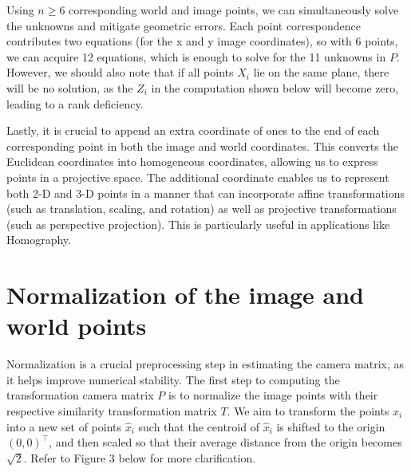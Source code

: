 \documentclass[12pt]{article}
\begin{document}
Using \( n \geq 6 \) corresponding world and image points, we can simultaneously solve the unknowns and mitigate geometric errors. Each point correspondence contributes two equations (for the x and y image coordinates), so with 6 points, we can acquire 12 equations, which is enough to solve for the 11 unknowns in \( P \). However, we should also note that if all points \( X_i \) lie on the same plane, there will be no solution, as the \( Z_i \) in the computation shown below will become zero, leading to a rank deficiency.

Lastly, it is crucial to append an extra coordinate of ones to the end of each corresponding point in both the image and world coordinates. This converts the Euclidean coordinates into homogeneous coordinates, allowing us to express points in a projective space. The additional coordinate enables us to represent both 2-D and 3-D points in a manner that can incorporate affine transformations (such as translation, scaling, and rotation) as well as projective transformations (such as perspective projection). This is particularly useful in applications like Homography.

\section{Normalization of the image and world points}
Normalization is a crucial preprocessing step in estimating the camera matrix, as it helps improve numerical stability. The first step to computing the transformation camera matrix \( P \) is to normalize the image points with their respective similarity transformation matrix \( T\). We aim to transform the points \( x_i \) into a new set of points \( \hat{x}_i \) such that the centroid of \( \hat{x}_i \) is shifted to the origin \( (0, 0)^\top \), and then scaled so that their average distance from the origin becomes \( \sqrt{2} \). Refer to Figure 3 below for more clarification. \\
\end{document}
